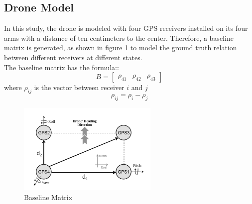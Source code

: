 \documentclass[journal,onecolumn]{IEEEtran}
\begin{document}
\subsection{Drone Model}
In this study, the drone is modeled with four GPS receivers installed on its four arms with a distance of ten centimeters to the center. Therefore, a baseline matrix is generated, as shown in figure \ref{drone} to
model the ground truth relation between different receivers at different states.\\
The baseline matrix has the formula::
\begin{equation}
  B = \begin{bmatrix}\rho_{41}& \rho_{42}& \rho_{43}\end{bmatrix}
\end{equation}
where $\rho_{ij}$ is the vector between receiver $i$ and $j$
\begin{equation}
  \rho_{ij} = \rho_{i} - \rho_{j}
\end{equation}
\begin{figure}
  \centering
  \captionsetup{justification=centering}
  \includegraphics[width=0.6\textwidth]{fig/drone.png}
  \caption{Baseline Matrix}
  \label{drone}
\end{figure}
\end{document}
